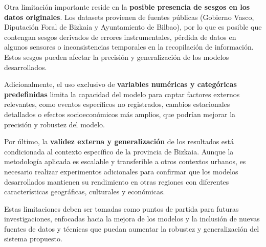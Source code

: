 Otra limitación importante reside en la \textbf{posible presencia de sesgos en los datos originales}. Los datasets provienen de fuentes públicas (Gobierno Vasco, Diputación Foral de Bizkaia y Ayuntamiento de Bilbao), por lo que es posible que contengan sesgos derivados de errores instrumentales, pérdida de datos en algunos sensores o inconsistencias temporales en la recopilación de información. Estos sesgos pueden afectar la precisión y generalización de los modelos desarrollados.

Adicionalmente, el uso exclusivo de \textbf{variables numéricas y categóricas predefinidas} limita la capacidad del modelo para captar factores externos relevantes, como eventos específicos no registrados, cambios estacionales detallados o efectos socioeconómicos más amplios, que podrían mejorar la precisión y robustez del modelo.

Por último, la \textbf{validez externa y generalización} de los resultados está condicionada al contexto específico de la provincia de Bizkaia. Aunque la metodología aplicada es escalable y transferible a otros contextos urbanos, es necesario realizar experimentos adicionales para confirmar que los modelos desarrollados mantienen su rendimiento en otras regiones con diferentes características geográficas, culturales y económicas.

Estas limitaciones deben ser tomadas como puntos de partida para futuras investigaciones, enfocadas hacia la mejora de los modelos y la inclusión de nuevas fuentes de datos y técnicas que puedan aumentar la robustez y generalización del sistema propuesto.


